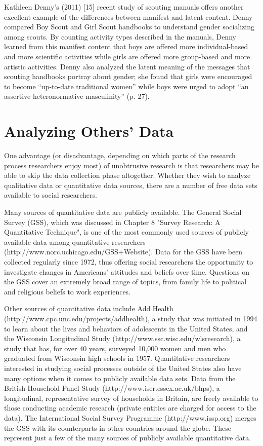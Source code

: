 Kathleen Denny’s (2011) [15] recent study of scouting manuals offers another excellent example of the differences between manifest and latent content. Denny compared Boy Scout and Girl Scout handbooks to understand gender socializing among scouts. By counting activity types described in the manuals, Denny learned from this manifest content that boys are offered more individual-based and more scientific activities while girls are offered more group-based and more artistic activities. Denny also analyzed the latent meaning of the messages that scouting handbooks portray about gender; she found that girls were encouraged to become ``up-to-date traditional women'' while boys were urged to adopt ``an assertive heteronormative masculinity'' (p. 27).

\section{Analyzing Others' Data}

One advantage (or disadvantage, depending on which parts of the research process researchers enjoy most) of unobtrusive research is that researchers may be able to skip the data collection phase altogether. Whether they wish to analyze qualitative data or quantitative data sources, there are a number of free data sets available to social researchers.

Many sources of quantitative data are publicly available. The General Social Survey (GSS), which was discussed in Chapter 8 "Survey Research: A Quantitative Technique", is one of the most commonly used sources of publicly available data among quantitative researchers (http://www.norc.uchicago.edu/GSS+Website). Data for the GSS have been collected regularly since 1972, thus offering social researchers the opportunity to investigate changes in Americans' attitudes and beliefs over time. Questions on the GSS cover an extremely broad range of topics, from family life to political and religious beliefs to work experiences.

Other sources of quantitative data include Add Health (http://www.cpc.unc.edu/projects/addhealth), a study that was initiated in 1994 to learn about the lives and behaviors of adolescents in the United States, and the Wisconsin Longitudinal Study (http://www.ssc.wisc.edu/wlsresearch), a study that has, for over 40 years, surveyed 10,000 women and men who graduated from Wisconsin high schools in 1957. Quantitative researchers interested in studying social processes outside of the United States also have many options when it comes to publicly available data sets. Data from the British Household Panel Study (http://www.iser.essex.ac.uk/bhps), a longitudinal, representative survey of households in Britain, are freely available to those conducting academic research (private entities are charged for access to the data). The International Social Survey Programme (http://www.issp.org) merges the GSS with its counterparts in other countries around the globe. These represent just a few of the many sources of publicly available quantitative data.


